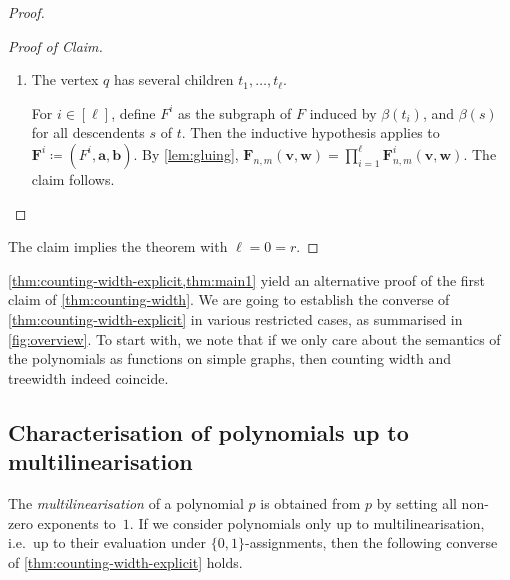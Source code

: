 \documentclass[11pt, DIV=15]{scrarticle}
\theoremstyle{definition}
\theoremstyle{plain}
\theoremstyle{remark}
\newenvironment{claimproof}[1][Proof of Claim]{\begin{proof}[#1] \renewcommand{\qedsymbol}{$\lrcorner$}}{ \end{proof}}
\begin{document}
\begin{proof}
\begin{claimproof}
\begin{enumerate}
				\item The vertex $q$ has several children $t_1, \dots, t_\ell$.
				
				For $i \in [\ell]$,
				define $F^i$ as the subgraph of $F$ induced by $\beta(t_i)$, and $\beta(s)$ for all descendents $s$ of $t$.
				Then the inductive hypothesis applies to $\boldsymbol{F}^i \coloneqq (F^i, \boldsymbol{a}, \boldsymbol{b})$.
				By \cref{lem:gluing}, $\boldsymbol{F}_{n,m}(\boldsymbol{v}, \boldsymbol{w}) = \prod_{i=1}^\ell \boldsymbol{F}^i_{n,m}(\boldsymbol{v}, \boldsymbol{w})$.
				The claim follows.\qedhere
			\end{enumerate}
		\end{claimproof}
		The claim implies the theorem with $\ell = 0 = r$.	
	\end{proof}
	
	\cref{thm:counting-width-explicit,thm:main1} yield an alternative proof of the first claim of \cref{thm:counting-width}.
We are going to establish the converse of \cref{thm:counting-width-explicit} in various restricted cases, as summarised in \cref{fig:overview}. To start with, we note that if we only care about the semantics of the polynomials as functions on simple graphs, then counting width and treewidth indeed coincide.
 	
	
	\subsection{Characterisation of polynomials up to multilinearisation}
	The \emph{multilinearisation} of a polynomial $p$ is obtained from $p$ by setting all non-zero exponents to~$1$. 
	If we consider polynomials only up to multilinearisation, i.e.\ up to their evaluation under $\{0,1\}$-assignments, then
	the following converse of \cref{thm:counting-width-explicit} holds.	
	\multilinear*
\end{document}
